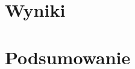 \documentclass[11pt]{extarticle}
\begin{document}
	\section{Wyniki}
	
	\section{Podsumowanie}
\end{document}
